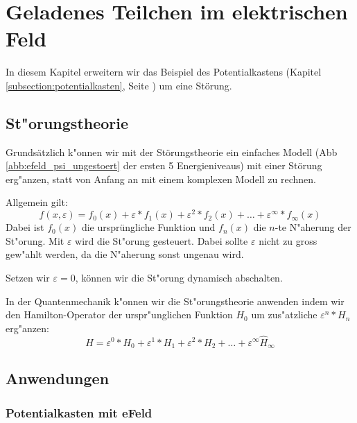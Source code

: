 \chapter{Geladenes Teilchen im elektrischen Feld\label{chapter:efeld}}
\begin{refsection}


In diesem Kapitel erweitern wir das Beispiel des Potentialkastens 
(Kapitel \ref{subsection:potentialkasten}, Seite \pageref{subsection:potentialkasten})
um eine St\"orung.

\section{St"orungstheorie}
Grundsätzlich k"onnen wir mit der St\"orungstheorie ein einfaches Modell 
(Abb \ref{abb:efeld_psi_ungestoert} der ersten 5 Energieniveaus) 
mit einer St\"orung erg"anzen, statt von Anfang an mit einem komplexen Modell zu rechnen.

Allgemein gilt:
\[
  f(x, \varepsilon) = f_0(x) + \varepsilon*f_1(x) + \varepsilon^2*f_2(x) + \ldots + \varepsilon^\infty*f_\infty(x)
\]
Dabei ist $f_0(x)$ die urspr\"ungliche Funktion und $f_n(x)$ die $n$-te  N"aherung der St"orung.
Mit $\varepsilon$ wird die St"orung gesteuert. Dabei sollte $\varepsilon$ nicht zu gross gew"ahlt werden, 
da die N"aherung sonst ungenau wird. 

Setzen wir $\varepsilon = 0$, k\"onnen wir die St"orung dynamisch abschalten.

In der Quantenmechanik k"onnen wir die St"orungstheorie anwenden indem wir den Hamilton-Operator der 
urspr"unglichen Funktion $H_0$ um zus"atzliche $\varepsilon^n*H_n$ erg"anzen:
\[
  H = \varepsilon^0*H_0 + \varepsilon^1*H_1 + \varepsilon^2*H_2 + \ldots + \varepsilon^\infty \hat H_\infty
\]












\section{Anwendungen}

\subsection{Potentialkasten mit eFeld}



\end{refsection}
